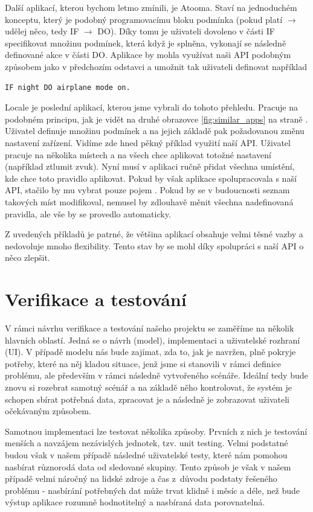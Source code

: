 \documentclass[thesis=M,czech]{FITthesis}[2012/06/26]
\begin{document}
Další aplikací, kterou bychom letmo zmínili, je Atooma\cite{atooma}. Staví na jednoduchém konceptu, který je podobný programovacímu bloku podmínka (pokud platí $\rightarrow$ udělej něco, tedy IF $\rightarrow$ DO). Díky tomu je uživateli dovoleno v části IF specifikovat množinu podmínek, která když je splněna, vykonají se následně definované akce v části DO. Aplikace by mohla využívat naši API podobným způsobem jako v předchozím odstavci a umožnit tak uživateli definovat například

\begin{verbatim}
IF night DO airplane mode on.
\end{verbatim}

Locale\cite{locale} je poslední aplikací, kterou jsme vybrali do tohoto přehledu. Pracuje na podobném principu, jak je vidět na druhé obrazovce \ref{fig:similar_apps} na straně \pageref{fig:similar_apps}. Uživatel definuje množinu podmínek a na jejich základě pak požadovanou změnu nastavení zařízení. Vidíme zde hned pěkný příklad využití naší API. Uživatel pracuje na několika místech a na všech chce aplikovat totožné nastavení (například ztlumit zvuk). Nyní musí v aplikaci ručně přidat všechna umístění, kde chce toto pravidlo aplikovat. Pokud by však aplikace spolupracovala s naší API, stačilo by mu vybrat pouze pojem . Pokud by se v budoucnosti seznam takových míst modifikoval, nemusel by zdlouhavě měnit všechna nadefinovaná pravidla, ale vše by se provedlo automaticky.

Z uvedených příkladů je patrné, že většina aplikací obsahuje velmi těsné vazby a nedovoluje mnoho flexibility. Tento stav by se mohl díky spolupráci s naší API o něco zlepšit.

\section{Verifikace a testování}
V rámci návrhu verifikace a testování našeho projektu se zaměříme na několik hlavních oblastí. Jedná se o návrh (model), implementaci a uživatelské rozhraní (UI). V případě modelu nás bude zajímat, zda to, jak je navržen, plně pokryje potřeby, které na něj kladou situace, jenž jsme si stanovili v rámci definice problému, ale především v rámci následně vytvořeného scénáře. Ideální tedy bude znovu si rozebrat samotný scénář a na základě něho kontrolovat, že systém je schopen sbírat potřebná data, zpracovat je a následně je zobrazovat uživateli očekávaným způsobem.

Samotnou implementaci lze testovat několika způsoby. Prvních z nich je testování menších a navzájem nezávislých jednotek, tzv. unit testing. Velmi podstatné budou však v našem případě následné uživatelské testy, které nám pomohou nasbírat různorodá data od sledované skupiny. Tento způsob je však v našem případě velmi náročný na lidské zdroje a čas z~důvodu podstaty řešeného problému - nasbírání potřebných dat může trvat klidně i měsíc a déle, než bude výstup aplikace rozumně hodnotitelný a nasbíraná data porovnatelná.
\end{document}
